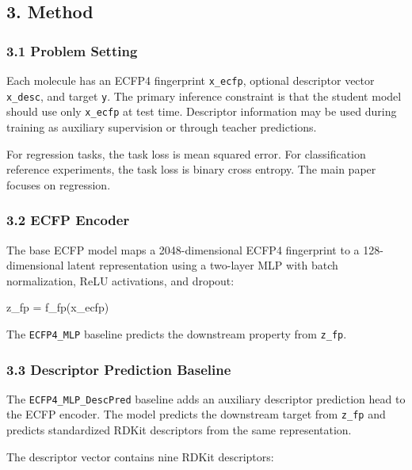 \documentclass[
]{article}
\newenvironment{Shaded}{}{}
\newcommand{\NormalTok}[1]{#1}
\begin{document}
\subsection{3. Method}\label{method}

\subsubsection{3.1 Problem Setting}\label{problem-setting}

Each molecule has an ECFP4 fingerprint \texttt{x\_ecfp}, optional
descriptor vector \texttt{x\_desc}, and target \texttt{y}. The primary
inference constraint is that the student model should use only
\texttt{x\_ecfp} at test time. Descriptor information may be used during
training as auxiliary supervision or through teacher predictions.

For regression tasks, the task loss is mean squared error. For
classification reference experiments, the task loss is binary cross
entropy. The main paper focuses on regression.

\subsubsection{3.2 ECFP Encoder}\label{ecfp-encoder}

The base ECFP model maps a 2048-dimensional ECFP4 fingerprint to a
128-dimensional latent representation using a two-layer MLP with batch
normalization, ReLU activations, and dropout:

\begin{Shaded}
\begin{Highlighting}[]
\NormalTok{z\_fp = f\_fp(x\_ecfp)}
\end{Highlighting}
\end{Shaded}

The \texttt{ECFP4\_MLP} baseline predicts the downstream property from
\texttt{z\_fp}.

\subsubsection{3.3 Descriptor Prediction
Baseline}\label{descriptor-prediction-baseline}

The \texttt{ECFP4\_MLP\_DescPred} baseline adds an auxiliary descriptor
prediction head to the ECFP encoder. The model predicts the downstream
target from \texttt{z\_fp} and predicts standardized RDKit descriptors
from the same representation.

The descriptor vector contains nine RDKit descriptors:
\end{document}
